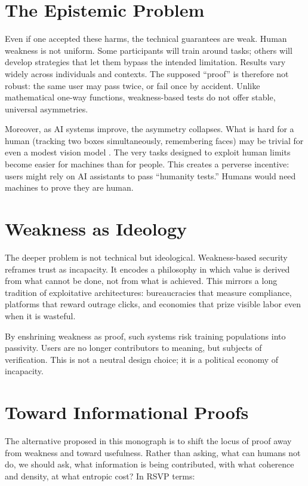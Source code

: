 \documentclass{book}
\begin{document}
\section{The Epistemic Problem}

Even if one accepted these harms, the technical guarantees are weak. Human weakness is not uniform. Some participants will train around tasks; others will develop strategies that let them bypass the intended limitation. Results vary widely across individuals and contexts. The supposed ``proof'' is therefore not robust: the same user may pass twice, or fail once by accident. Unlike mathematical one-way functions, weakness-based tests do not offer stable, universal asymmetries.

Moreover, as AI systems improve, the asymmetry collapses. What is hard for a human (tracking two boxes simultaneously, remembering faces) may be trivial for even a modest vision model \cite{mnih2013, szegedy2014}. The very tasks designed to exploit human limits become easier for machines than for people. This creates a perverse incentive: users might rely on AI assistants to pass ``humanity tests.'' Humans would need machines to prove they are human.

\section{Weakness as Ideology}

The deeper problem is not technical but ideological. Weakness-based security reframes trust as incapacity. It encodes a philosophy in which value is derived from what cannot be done, not from what is achieved. This mirrors a long tradition of exploitative architectures: bureaucracies that measure compliance, platforms that reward outrage clicks, and economies that prize visible labor even when it is wasteful.

By enshrining weakness as proof, such systems risk training populations into passivity. Users are no longer contributors to meaning, but subjects of verification. This is not a neutral design choice; it is a political economy of incapacity.

\section{Toward Informational Proofs}

The alternative proposed in this monograph is to shift the locus of proof away from weakness and toward usefulness. Rather than asking, what can humans not do, we should ask, what information is being contributed, with what coherence and density, at what entropic cost? In RSVP terms:
\end{document}
